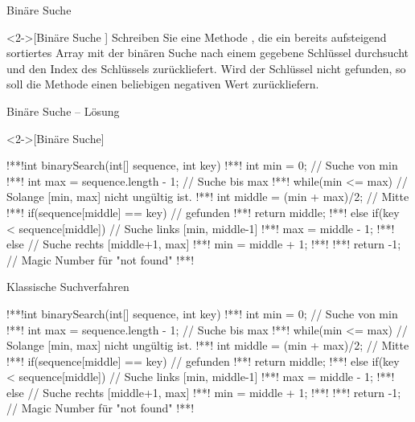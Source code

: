 \ifull
\begin{frame}[c]{Binäre Suche}
    \begin{exercise}<2->[Binäre Suche ]
        \pause{}Schreiben Sie eine Methode , die ein bereits aufsteigend sortiertes Array mit der binären Suche nach einem gegebene Schlüssel durchsucht und den Index des Schlüssels zurückliefert.
        Wird der Schlüssel nicht gefunden, so soll die Methode einen beliebigen negativen Wert zurückliefern.
    \end{exercise}
\end{frame}

\begin{frame}[fragile,c]{Binäre Suche -- Lösung}
    \begin{solve}<2->[Binäre Suche]
\begin{plainjava}
!**!int binarySearch(int[] sequence, int key){
!**!    int min = 0; // Suche von min
!**!    int max = sequence.length - 1; // Suche bis max
!**!    while(min <= max) { // Solange [min, max] nicht ungültig ist.
!**!        int middle = (min + max)/2; // Mitte
!**!        if(sequence[middle] == key) // gefunden
!**!            return middle;
!**!        else if(key < sequence[middle]) // Suche links [min, middle-1]
!**!            max = middle - 1;
!**!        else // Suche rechts [middle+1, max]
!**!            min = middle + 1;
!**!    }
!**!    return -1; // Magic Number für "not found"
!**!}
\end{plainjava}
    \end{solve}
\end{frame}
\else
\begin{frame}[fragile,c]{Klassische Suchverfahren}
    \begin{plainjava}
!**!int binarySearch(int[] sequence, int key){
!**!    int min = 0; // Suche von min
!**!    int max = sequence.length - 1; // Suche bis max
!**!    while(min <= max) { // Solange [min, max] nicht ungültig ist.
!**!        int middle = (min + max)/2; // Mitte
!**!        if(sequence[middle] == key) // gefunden
!**!            return middle;
!**!        else if(key < sequence[middle]) // Suche links [min, middle-1]
!**!            max = middle - 1;
!**!        else // Suche rechts [middle+1, max]
!**!            min = middle + 1;
!**!    }
!**!    return -1; // Magic Number für "not found"
!**!}
\end{plainjava}
\end{frame}
\fi


